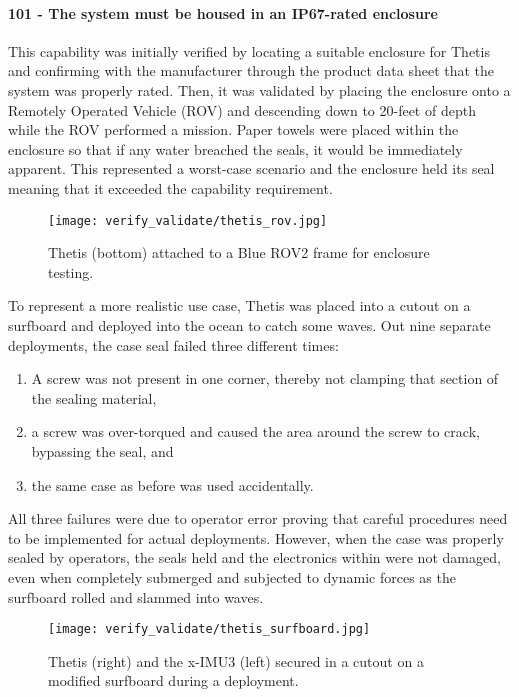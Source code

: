 \paragraph*{101 - The system must be housed in an IP67-rated enclosure} This capability was initially verified by locating a suitable enclosure for Thetis and confirming with the manufacturer through the product data sheet that the system was properly rated.
Then, it was validated by placing the enclosure onto a Remotely Operated Vehicle (ROV) and descending down to 20-feet of depth while the ROV performed a mission.
Paper towels were placed within the enclosure so that if any water breached the seals, it would be immediately apparent.
This represented a worst-case scenario and the enclosure held its seal meaning that it exceeded the capability requirement.

\begin{figure}[h!]
    \caption[ROV Setup]{Thetis (bottom) attached to a Blue ROV2 frame for enclosure testing.}
    \centering
    \texttt{[image: verify\_validate/thetis\_rov.jpg]}
\end{figure}

To represent a more realistic use case, Thetis was placed into a cutout on a surfboard and deployed into the ocean to catch some waves.
Out nine separate deployments, the case seal failed three different times:

\begin{enumerate}
    \item A screw was not present in one corner, thereby not clamping that section of the sealing material, 
    \item a screw was over-torqued and caused the area around the screw to crack, bypassing the seal, and 
    \item the same case as before was used accidentally.
\end{enumerate}

All three failures were due to operator error proving that careful procedures need to be implemented for actual deployments.
However, when the case was properly sealed by operators, the seals held and the electronics within were not damaged, even when completely submerged and subjected to dynamic forces as the surfboard rolled and slammed into waves.

\begin{figure}[h!]
    \caption[Surfboard Setup]{Thetis (right) and the x-IMU3 (left) secured in a cutout on a modified surfboard during a deployment.}
    \centering
    \texttt{[image: verify\_validate/thetis\_surfboard.jpg]}
\end{figure}

